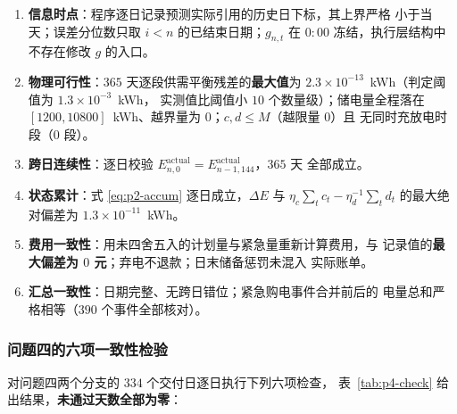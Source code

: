 \begin{enumerate}
  \item \textbf{信息时点}：程序逐日记录预测实际引用的历史日下标，其上界严格
        小于当天；误差分位数只取 $i<n$ 的已结束日期；$g_{n,t}$ 在 $0{:}00$
        冻结，执行层结构中不存在修改 $g$ 的入口。
  \item \textbf{物理可行性}：$365$ 天逐段供需平衡残差的\textbf{最大值}为
        $2.3\times10^{-13}$~kWh（判定阈值为 $1.3\times10^{-3}$~kWh，
        实测值比阈值小 $10$ 个数量级）；储电量全程落在
        $[1200,10800]$~kWh、越界量为 $0$；$c,d\le M$（越限量 $0$）且
        无同时充放电时段（$0$ 段）。
  \item \textbf{跨日连续性}：逐日校验
        $E_{n,0}^{\mathrm{actual}}=E_{n-1,144}^{\mathrm{actual}}$，$365$ 天
        全部成立。
  \item \textbf{状态累计}：式 \eqref{eq:p2-accum} 逐日成立，$\Delta E$ 与
        $\eta_c\sum_t c_t-\eta_d^{-1}\sum_t d_t$ 的最大绝对偏差为
        $1.3\times10^{-11}$~kWh。
  \item \textbf{费用一致性}：用未四舍五入的计划量与紧急量重新计算费用，与
        记录值的\textbf{最大偏差为 $0$ 元}；弃电不退款；日末储备惩罚未混入
        实际账单。
  \item \textbf{汇总一致性}：日期完整、无跨日错位；紧急购电事件合并前后的
        电量总和严格相等（$390$ 个事件全部核对）。
\end{enumerate}


\subsubsection{问题四的六项一致性检验}

对问题四两个分支的 $334$ 个交付日逐日执行下列六项检查，
表~\ref{tab:p4-check} 给出结果，\textbf{未通过天数全部为零}：

